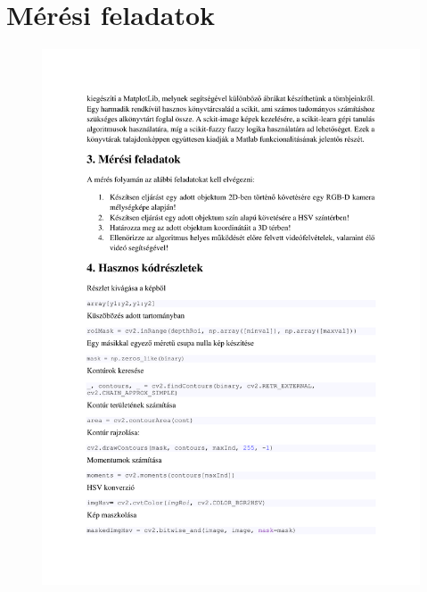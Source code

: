 \chapter{Mérési feladatok}\label{sect:LatexTools}

\begin{figure}[!ht]
	\includegraphics[trim = 20mm 182mm 20mm 69mm,clip, width=150mm,keepaspectratio]{figures/feladatok_m08.pdf}
	\label{fig:Road-of-a-char}
\end{figure}

